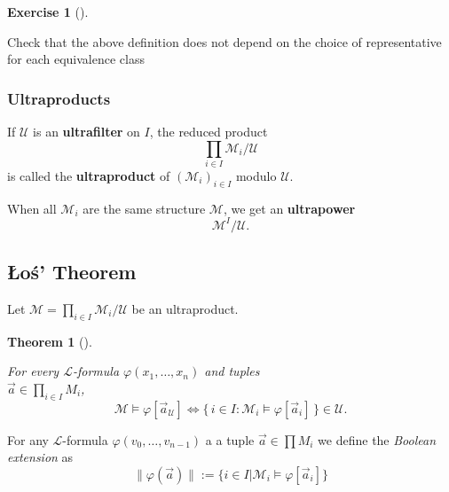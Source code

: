 \documentclass[
]{article}
\theoremstyle{definition}
\newtheorem{exercise}{Exercise}[section]
\theoremstyle{plain}
\newtheorem{theorem}{Theorem}[section]
\theoremstyle{plain}
\theoremstyle{remark}
\begin{document}
\begin{exercise}[]\protect\hypertarget{exr-}{}\label{exr-}

Check that the above definition does not depend on the choice of
representative for each equivalence class

\end{exercise}

\subsubsection{Ultraproducts}\label{ultraproducts-1}

If \(\mathcal{U}\) is an \textbf{ultrafilter} on \(I\), the reduced
product \[
\prod_{i \in I} \mathcal{M}_i / \mathcal{U}
\] is called the \textbf{ultraproduct} of \((\mathcal{M}_i)_{i \in I}\)
modulo \(\mathcal{U}\).

When all \(\mathcal{M}_i\) are the same structure \(\mathcal{M}\), we
get an \textbf{ultrapower} \[
\mathcal{M}^I / \mathcal{U}.
\]

\subsection{Łoś' Theorem}\label{ux142oux15b-theorem}

Let \(\mathcal{M} = \prod_{i \in I} \mathcal{M}_i / \mathcal{U}\) be an
ultraproduct.

\begin{theorem}[]\protect\hypertarget{thm-los}{}\label{thm-los}

\hfill\break
For every \(\mathcal{L}\)-formula \(\varphi(x_1,\dots,x_n)\) and
tuples\\
\(\vec a \in \prod_{i \in I} M_i\), \[
\mathcal{M} \models \varphi[\vec a_{\mathcal{U}}]
\iff
\{\, i \in I : \mathcal{M}_i \models \varphi[\vec a_i]\,\} \in \mathcal{U}.
\]

\end{theorem}

For any \(\mathcal{L}\)-formula \(\varphi(v_0,\ldots,v_{n-1})\) a a
tuple \(\vec{a} \in \prod M_i\) we define the \emph{Boolean extension}
as \[
\|\varphi(\vec{a}) \| := \{i \in I| \mathcal{M}_i \models \varphi[\vec{a}_i]\} 
\]
\end{document}
